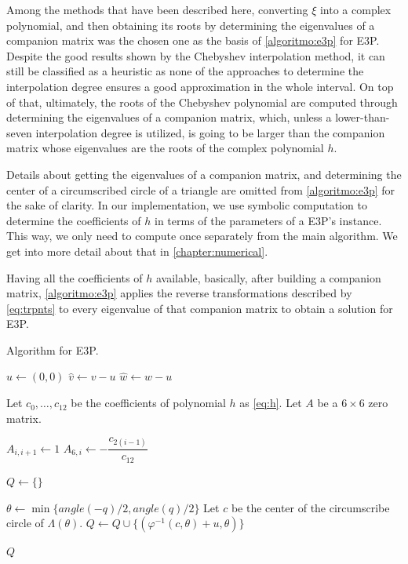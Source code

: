 Among the methods that have been described here, converting $\xi$ into a complex polynomial, and then obtaining its roots by determining the eigenvalues of a companion matrix was the chosen one as the basis of \autoref{algoritmo:e3p} for E3P.
Despite the good results shown by the Chebyshev interpolation method,
it can still be classified as a heuristic as none of the approaches to determine the interpolation degree ensures a good approximation in the whole interval.
On top of that, ultimately, the roots of the Chebyshev polynomial are computed through determining the eigenvalues of a companion matrix, which, unless a lower-than-seven interpolation degree is utilized, is going to be larger than the companion matrix whose eigenvalues are the roots of the complex polynomial $h$.

Details about getting the eigenvalues of a companion matrix, and determining the center of a circumscribed circle of a triangle are omitted from \autoref{algoritmo:e3p} for the sake of clarity. 
In our implementation, we use symbolic computation to determine the coefficients of $h$ in terms of the parameters of a E3P's instance. This way, we only need to compute once separately from the main algorithm. We get into more detail about that in \autoref{chapter:numerical}.

Having all the coefficients of $h$ available, basically, after building a companion matrix, \autoref{algoritmo:e3p} applies the reverse transformations described by \autoref{eq:trpnts} to every eigenvalue of that companion matrix to obtain a solution for E3P.

\begin{algoritmo}
	\caption{Algorithm for E3P.}\label{algoritmo:e3p}
	\begin{algorithmic}[1]
		
		\item[]
		
		
		\State $\hat{u}\gets (0,0)$ 
		\State $\hat{v} \gets v-u$
		\State $\hat{w} \gets w-u$
		
		\State Let $c_0, \dots, c_{12}$ be the coefficients of polynomial $h$ as \autoref{eq:h}.
		\State Let $A$ be a $6\times6$ zero matrix.
		
			\State $A_{i,i+1} \gets 1$
			\State $A_{6,i} \gets -\dfrac{c_{2(i-1)}}{c_{12}}$
		\EndFor

		
		\State $Q \gets \{\}$
		
		 
		\State $\theta\gets \min\{angle(-q)/2, angle(q)/2\}$
			\State Let $c$ be the center of the circumscribe circle of $\Lambda(\theta)$.
			\State $Q \gets Q\cup \{(\varphi^{-1}(c, \theta)+u, \theta)\}$
		\EndIf
		\EndFor
				
		\State \Return $Q$
		\EndProcedure
	\end{algorithmic}
\end{algoritmo}

